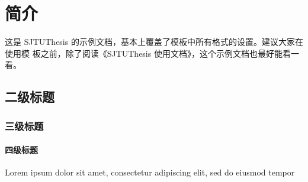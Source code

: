 
\chapter{简介}
这是 SJTUThesis 的示例文档，基本上覆盖了模板中所有格式的设置。建议大家在使用模
板之前，除了阅读《SJTUThesis 使用文档》，这个示例文档也最好能看一看。

\section{二级标题}

\subsection{三级标题}

\subsubsection{四级标题}
Lorem ipsum dolor sit amet, consectetur adipiscing elit, sed do eiusmod tempor


